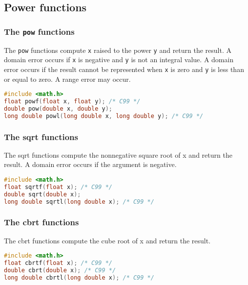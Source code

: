 \subsection{Power functions}
\subsubsection{The \texttt{pow} functions}
The \texttt{pow} functions compute \texttt{x} raised to the power \texttt{y}
and return the result. A domain error occurs if \texttt{x} is negative and
\texttt{y} is not an integral value. A domain error occurs if the result cannot
be represented when \texttt{x} is zero and \texttt{y} is less than or equal to
zero. A range error may occur.
\lstset{basicstyle=\scriptsize, numbers=left, captionpos=b, tabsize=4}
\begin{lstlisting}[caption=Section \thesection listing \arabic{furthermathcnt},language={C},
breaklines=true,xleftmargin=15pt, label=lst:section\thesection listing\arabic{furthermathcnt}]
#include <math.h>
float powf(float x, float y); /* C99 */
double pow(double x, double y);
long double powl(long double x, long double y); /* C99 */
\end{lstlisting}

\subsubsection{The sqrt functions}
The sqrt functions compute the nonnegative square root of x and return the
result. A domain error occurs if the argument is negative.
\lstset{basicstyle=\scriptsize, numbers=left, captionpos=b, tabsize=4}
\begin{lstlisting}[caption=Section \thesection listing \arabic{furthermathcnt},language={C},
breaklines=true,xleftmargin=15pt, label=lst:section\thesection listing\arabic{furthermathcnt}]
#include <math.h>
float sqrtf(float x); /* C99 */
double sqrt(double x);
long double sqrtl(long double x); /* C99 */
\end{lstlisting}

\subsubsection{The cbrt functions}
The cbrt functions compute the cube root of x and return the result.
\lstset{basicstyle=\scriptsize, numbers=left, captionpos=b, tabsize=4}
\begin{lstlisting}[caption=Section \thesection listing \arabic{furthermathcnt},language={C},
breaklines=true,xleftmargin=15pt, label=lst:section\thesection listing\arabic{furthermathcnt}]
#include <math.h>
float cbrtf(float x); /* C99 */
double cbrt(double x); /* C99 */
long double cbrtl(long double x); /* C99 */
\end{lstlisting}

